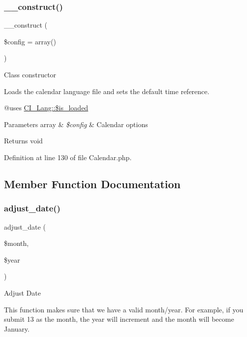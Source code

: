 \subsubsection{\texorpdfstring{\_\_construct()}{\_\_construct()}}
{\footnotesize\ttfamily \+\_\+\+\_\+construct (\begin{DoxyParamCaption}\item[{}]{\$config = {\ttfamily array()} }\end{DoxyParamCaption})}

Class constructor

Loads the calendar language file and sets the default time reference.

@uses \mbox{\hyperlink{class_c_i___lang_a908e9ad52a5d1956d360689452f6bdbe}{C\+I\+\_\+\+Lang\+::\$is\+\_\+loaded}}


\begin{DoxyParams}[1]{Parameters}
array & {\em \$config} & Calendar options \\
\hline
\end{DoxyParams}
\begin{DoxyReturn}{Returns}
void 
\end{DoxyReturn}


Definition at line 130 of file Calendar.\+php.



\subsection{Member Function Documentation}
\mbox{\label{class_c_i___calendar_ac216356ab0ff31e8538fd9208a26577a}} 
\subsubsection{\texorpdfstring{adjust\_date()}{adjust\_date()}}
{\footnotesize\ttfamily adjust\+\_\+date (\begin{DoxyParamCaption}\item[{}]{\$month,  }\item[{}]{\$year }\end{DoxyParamCaption})}

Adjust Date

This function makes sure that we have a valid month/year. For example, if you submit 13 as the month, the year will increment and the month will become January.


